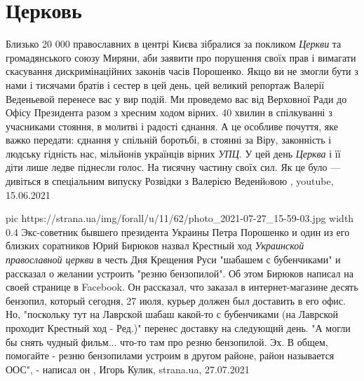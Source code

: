  
 
 
 
 
\chapter{Церковь}
\label{sec:slova.cerkov}

Близько 20 000 православних в центрі Києва зібралися за покликом \emph{Церкви} та
громадянського союзу Миряни, аби заявити про порушення своїх прав і вимагати
скасування дискримінаційних законів часів Порошенко.  Якщо ви не змогли бути з
нами і тисячами братів і сестер в цей день, цей великий репортаж Валерії
Веденьевой перенесе вас у вир подій. Ми проведемо вас від Верховної Ради до
Офісу Президента разом з хресним ходом вірних. 40 хвилин в спілкуванні з
учасниками стояння, в молитві і радості єднання. А це особливе почуття, яке
важко передати: єднання у спільній боротьбі, в стоянні за Віру, законність і
людську гідність нас, мільйонів українців вірних \emph{УПЦ}.  У цей день \emph{Церква} і її
діти лише ледве піднесли голос. На тисячну частину своїх сил.  Як це було —
дивіться в спеціальним випуску Розвідки з Валерією Веденйoвою
,
youtube, 15.06.2021

\ifcmt
  pic https://strana.ua/img/forall/u/11/62/photo_2021-07-27_15-59-03.jpg
  width 0.4
\fi
Экс-советник бывшего президента Украины Петра Порошенко и один из его близких
соратников Юрий Бирюков назвал Крестный ход \emph{Украинской православной
церкви} в честь Дня Крещения Руси "шабашем с бубенчиками" и рассказал о желании
устроить "резню бензопилой".  Об этом Бирюков написал на своей странице в
Facebook.  Он рассказал, что заказал в интернет-магазине десять бензопил,
который сегодня, 27 июля, курьер должен был доставить в его офис. Но,
"поскольку тут на Лаврской шабаш какой-то с бубенчиками (на Лаврской проходит
Крестный ход - Ред.)" перенес доставку на следующий день.  "А могли бы снять
чудный фильм... что-то там про резню бензопилой. Эх. В общем, помогайте - резню
бензопилами устроим в другом районе, район называется ООС", - написал он
, 
Игорь Кулик, strana.ua, 27.07.2021
